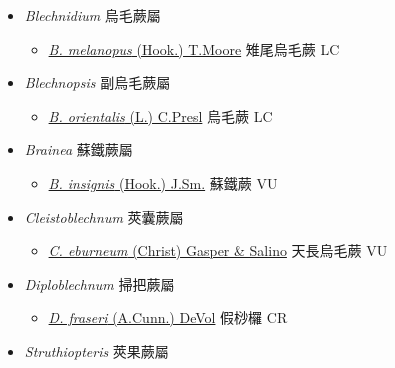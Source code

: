 
  \begin{itemize}
 \item[    ] \textit{Blechnidium} 烏毛蕨屬
                                
  \begin{itemize}
        \item[] \href{http://www.theplantlist.org/tpl1.1/search?q=Blechnidium+melanopus}{\textit{B. melanopus} (Hook.) T.Moore}   雉尾烏毛蕨   LC
  \end{itemize}
 \item[    ] \textit{Blechnopsis} 副烏毛蕨屬
                                
  \begin{itemize}
        \item[] \href{http://www.theplantlist.org/tpl1.1/search?q=Blechnopsis+orientalis}{\textit{B. orientalis} (L.) C.Presl}   烏毛蕨   LC
  \end{itemize}
 \item[    ] \textit{Brainea} 蘇鐵蕨屬
                                
  \begin{itemize}
        \item[] \href{http://www.theplantlist.org/tpl1.1/search?q=Brainea+insignis}{\textit{B. insignis} (Hook.) J.Sm.}   蘇鐵蕨   VU
  \end{itemize}
 \item[    ] \textit{Cleistoblechnum} 莢囊蕨屬
                                
  \begin{itemize}
        \item[] \href{http://www.theplantlist.org/tpl1.1/search?q=Cleistoblechnum+eburneum}{\textit{C. eburneum} (Christ) Gasper \& Salino}   天長烏毛蕨   VU
  \end{itemize}
 \item[    ] \textit{Diploblechnum} 掃把蕨屬
                                
  \begin{itemize}
        \item[] \href{http://www.theplantlist.org/tpl1.1/search?q=Diploblechnum+fraseri}{\textit{D. fraseri} (A.Cunn.) DeVol}   假桫欏   CR
  \end{itemize}
 \item[    ] \textit{Struthiopteris} 莢果蕨屬
                                

\end{itemize}
